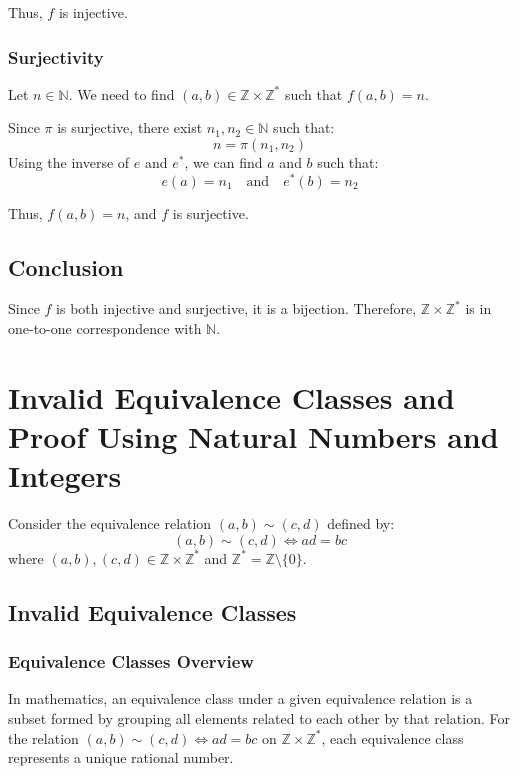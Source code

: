 Thus, \(f\) is injective.

\subsubsection*{Surjectivity}

Let \(n \in \mathbb{N}\). We need to find \((a, b) \in \mathbb{Z} \times \mathbb{Z}^*\) such that \(f(a, b) = n\).

Since \(\pi\) is surjective, there exist \(n_1, n_2 \in \mathbb{N}\) such that:
\[
n = \pi(n_1, n_2)
\]
Using the inverse of \(e\) and \(e^*\), we can find \(a\) and \(b\) such that:
\[
e(a) = n_1 \quad \text{and} \quad e^*(b) = n_2
\]

Thus, \(f(a, b) = n\), and \(f\) is surjective.

\subsection*{Conclusion}

Since \(f\) is both injective and surjective, it is a bijection. Therefore, \(\mathbb{Z} \times \mathbb{Z}^*\) is in one-to-one correspondence with \(\mathbb{N}\).

\section*{Invalid Equivalence Classes and Proof Using Natural Numbers and Integers}

Consider the equivalence relation \((a, b) \sim (c, d)\) defined by:
\[
(a, b) \sim (c, d) \iff ad = bc
\]
where \((a, b), (c, d) \in \mathbb{Z} \times \mathbb{Z}^*\) and \(\mathbb{Z}^* = \mathbb{Z} \setminus \{0\}\).

\subsection*{Invalid Equivalence Classes}

\subsubsection*{Equivalence Classes Overview}

In mathematics, an equivalence class under a given equivalence relation is a subset formed by grouping all elements related to each other by that relation. For the relation \((a, b) \sim (c, d) \iff ad = bc\) on \(\mathbb{Z} \times \mathbb{Z}^*\), each equivalence class represents a unique rational number.

